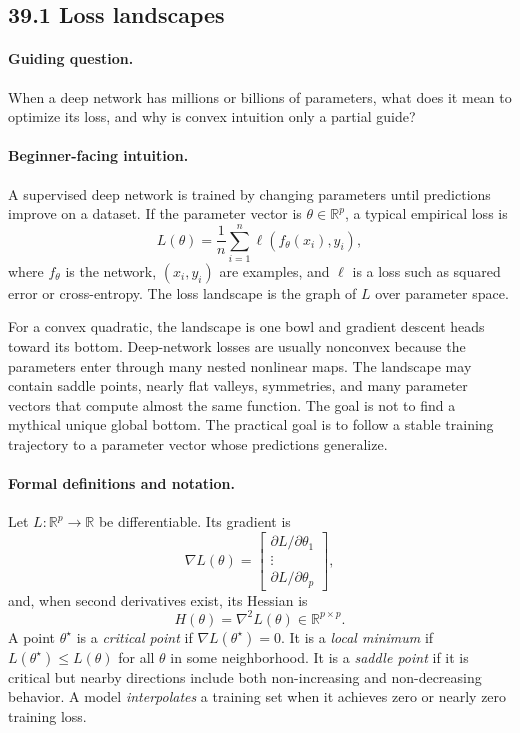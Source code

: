 \subsection{39.1 Loss landscapes}

\paragraph{Guiding question.}
When a deep network has millions or billions of parameters, what does it mean to optimize its loss, and why is convex intuition only a partial guide?

\paragraph{Beginner-facing intuition.}
A supervised deep network is trained by changing parameters until predictions improve on a dataset. If the parameter vector is \(\theta\in\mathbb{R}^p\), a typical empirical loss is
\[
L(\theta)=\frac{1}{n}\sum_{i=1}^n \ell(f_\theta(x_i),y_i),
\]
where \(f_\theta\) is the network, \((x_i,y_i)\) are examples, and \(\ell\) is a loss such as squared error or cross-entropy. The loss landscape is the graph of \(L\) over parameter space.

For a convex quadratic, the landscape is one bowl and gradient descent heads toward its bottom. Deep-network losses are usually nonconvex because the parameters enter through many nested nonlinear maps. The landscape may contain saddle points, nearly flat valleys, symmetries, and many parameter vectors that compute almost the same function. The goal is not to find a mythical unique global bottom. The practical goal is to follow a stable training trajectory to a parameter vector whose predictions generalize.

\paragraph{Formal definitions and notation.}
Let \(L:\mathbb{R}^p\to\mathbb{R}\) be differentiable. Its gradient is
\[
\nabla L(\theta)=
\begin{bmatrix}
\partial L/\partial \theta_1\\
\vdots\\
\partial L/\partial \theta_p
\end{bmatrix},
\]
and, when second derivatives exist, its Hessian is
\[
H(\theta)=\nabla^2 L(\theta)\in\mathbb{R}^{p\times p}.
\]
A point \(\theta^\star\) is a \emph{critical point} if \(\nabla L(\theta^\star)=0\). It is a \emph{local minimum} if \(L(\theta^\star)\leq L(\theta)\) for all \(\theta\) in some neighborhood. It is a \emph{saddle point} if it is critical but nearby directions include both non-increasing and non-decreasing behavior. A model \emph{interpolates} a training set when it achieves zero or nearly zero training loss.


